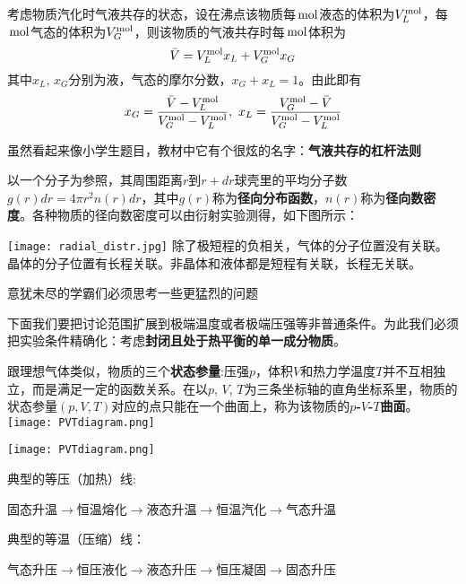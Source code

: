 \documentclass[CJK]{beamer}
\begin{document}
\begin{frame}
\bch
考虑物质汽化时气液共存的状态，设在沸点该物质每$\,\mathrm{mol}$液态的体积为$V_L^{\rm mol}$，每$\,\mathrm{mol}$气态的体积为$V_G^{\rm mol}$，则该物质的气液共存时每$\,\mathrm{mol}$体积为
$$\bar{V} = V_L^{\rm mol} x_L + V_G^{\rm mol} x_G$$ 
其中$x_L$, $x_G$分别为液，气态的摩尔分数，$x_G + x_L = 1$。由此即有
$$x_G = \frac{\bar{V} - V_L^{\rm mol}}{V_G^{\rm mol} - V_L^{\rm mol}},\ x_L = \frac{V_G^{\rm mol} - \bar{V}  }{V_G^{\rm mol} - V_L^{\rm mol}}$$

虽然看起来像小学生题目，教材中它有个很炫的名字：{\bf 气液共存的杠杆法则}
\ech
\end{frame}

\begin{frame}
\bch
{\small 
 以一个分子为参照，其周围距离$r$到$r+dr$球壳里的平均分子数$g(r)dr = 4\pi r^2n(r)dr$，其中$g(r)$称为{\bf 径向分布函数}，$n(r)$称为{\bf 径向数密度}。各种物质的径向数密度可以由衍射实验测得，如下图所示：}

\texttt{[image: radial\_distr.jpg]}
\emini
{}
{\small
除了极短程的负相关，气体的分子位置没有关联。晶体的分子位置有长程关联。非晶体和液体都是短程有关联，长程无关联。}
\emini
\ech
\end{frame}

\begin{frame}
\bch


\bcenter
意犹未尽的学霸们必须思考一些更猛烈的问题
\ecenter

\ech
\end{frame}

\begin{frame}
\bch
\bitem
\item{下面我们要把讨论范围扩展到极端温度或者极端压强等非普通条件。为此我们必须把实验条件精确化：考虑{\bf 封闭且处于热平衡的单一成分物质}。}
\item{
跟理想气体类似，物质的三个{\bf 状态参量}:压强$p$，体积$V$和热力学温度$T$并不互相独立，而是满足一定的函数关系。在以$p$, $V$, $T$为三条坐标轴的直角坐标系里，物质的状态参量$(p, V, T)$对应的点只能在一个曲面上，称为该物质的{\bf $p$-$V$-$T$曲面}。
\emini
{}
\texttt{[image: PVTdiagram.png]}
\emini
}
\eitem
\ech
\end{frame}

\begin{frame}
\bch
{}
\texttt{[image: PVTdiagram.png]}
\emini
{}
{\small

\bitem
\item{典型的等压（加热）线:

 固态升温$\rightarrow$恒温熔化$\rightarrow$液态升温$\rightarrow$恒温汽化$\rightarrow$气态升温}

\item{典型的等温（压缩）线：

气态升压$\rightarrow$恒压液化$\rightarrow$液态升压$\rightarrow$恒压凝固$\rightarrow$固态升压

}
\eitem
}
\emini
\ech
\end{frame}
\end{document}
